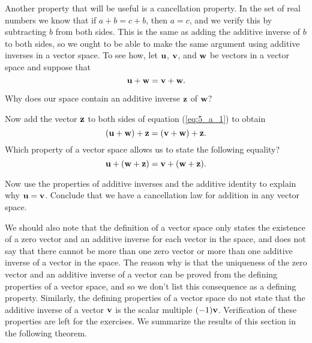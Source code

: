 \begin{activity} \label{act:5_a_1} Another property that will be useful is a cancellation property. In the set of real numbers we know that if $a+b = c+b$, then $a=c$, and we verify this by subtracting $b$ from both sides. This is the same as adding the additive inverse of $b$ to both sides, so we ought to be able to make the same argument using additive inverses in a vector space. To see how, let $\mathbf{u}$, $\mathbf{v}$, and $\mathbf{w}$ be vectors in a vector space and suppose that 
\begin{equation} \label{eq:5_a_1}
\mathbf{u} + \mathbf{w} = \mathbf{v} + \mathbf{w}.
\end{equation}
\ba
\item Why does our space contain an additive inverse $\mathbf{z}$ of $\mathbf{w}$?



\item Now add the vector $\mathbf{z}$ to both sides of equation (\ref{eq:5_a_1}) to obtain
\begin{equation} \label{eq:5_a_2}
(\mathbf{u}+\mathbf{w}) + \mathbf{z} = (\mathbf{v}+\mathbf{w}) + \mathbf{z}.
\end{equation}
Which property of a vector space allows us to state the following equality? 
\begin{equation} \label{eq:5_a_3}
\mathbf{u}+(\mathbf{w}+\mathbf{z}) = \mathbf{v}+(\mathbf{w}+\mathbf{z}).
\end{equation}



\item Now use the properties of additive inverses and the additive identity to explain why $\mathbf{u} = \mathbf{v}$. Conclude that we have a cancellation law for addition in any vector space.



\ea

\end{activity}



We should also note that the definition of a vector space only states the existence of a zero vector and an additive inverse for each vector in the space, and does not say that there cannot be more than one zero vector or more than one additive inverse of a vector in the space. The reason why is that the uniqueness of the zero vector and an additive inverse of a vector can be proved from the defining properties of a vector space, and so we don't list this consequence as a defining property. Similarly, the defining properties of a vector space do not state that the additive inverse of a vector $\mathbf{v}$ is the scalar multiple $(-1)\mathbf{v}$. Verification of these properties are left for the exercises. We summarize the results of this section in the following theorem.



